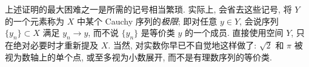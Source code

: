 \begin{Remark}
\label{rem:completion-limit-notation}
上述证明的最大困难之一是所需的记号相当繁琐. 实际上, 会省去这些记号, 将 $Y$ 的一个元素称为 $X$ 中某个 Cauchy 序列的\emph{极限}; 即对任意 $y\in Y$, 会说序列 $\{y_n\}\subset X$ 满足 $y_n\to y$, 而不说 $\{y_n\}$ 是等价类 $y$ 的一个成员. 直接使用空间 $Y$, 只在绝对必要时才重新提及 $X$. 当然, 对实数你早已不自觉地这样做了: $\sqrt2$ 和 $\pi$ 被视为数轴上的单个点, 或至多视为小数展开, 而不是有理数序列的等价类.
\end{Remark}
